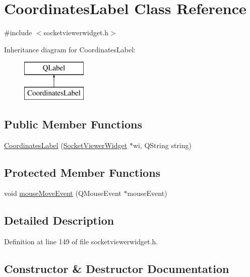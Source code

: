 \hypertarget{class_coordinates_label}{}\section{Coordinates\+Label Class Reference}
\label{class_coordinates_label}


{\ttfamily \#include $<$socketviewerwidget.\+h$>$}

Inheritance diagram for Coordinates\+Label\+:\begin{figure}[H]
\begin{center}
\leavevmode
\includegraphics[height=2.000000cm]{class_coordinates_label}
\end{center}
\end{figure}
\subsection*{Public Member Functions}
\begin{DoxyCompactItemize}
\item 
\mbox{\hyperlink{class_coordinates_label_afab379b539927e6654e47d53a7f491f0}{Coordinates\+Label}} (\mbox{\hyperlink{class_socket_viewer_widget}{Socket\+Viewer\+Widget}} $\ast$wi, Q\+String string)
\end{DoxyCompactItemize}
\subsection*{Protected Member Functions}
\begin{DoxyCompactItemize}
\item 
void \mbox{\hyperlink{class_coordinates_label_acc2d36255eb21eb37cae85de5d88c439}{mouse\+Move\+Event}} (Q\+Mouse\+Event $\ast$mouse\+Event)
\end{DoxyCompactItemize}


\subsection{Detailed Description}


Definition at line 149 of file socketviewerwidget.\+h.



\subsection{Constructor \& Destructor Documentation}
\mbox{\label{class_coordinates_label_afab379b539927e6654e47d53a7f491f0}} 
